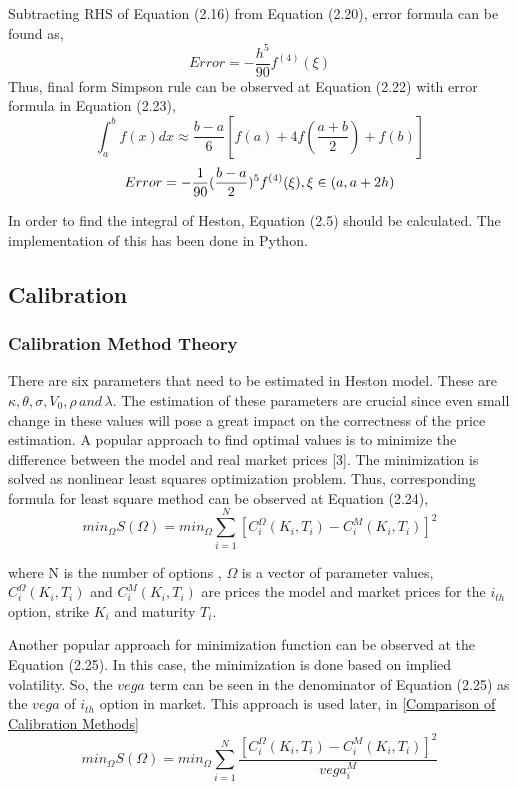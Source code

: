 \documentclass[fontsize=12pt]{article}
\numberwithin{equation}{section} %
\numberwithin{figure}{section} %
\numberwithin{table}{section} %
\begin{document}
Subtracting RHS of Equation (2.16) from Equation (2.20), error formula can be found as,
\begin{equation}
Error = -\dfrac{h^5}{90} f^{(4)} (\xi)
\end{equation}
Thus, final form Simpson rule can be observed at Equation (2.22) with error formula in Equation (2.23),
\begin{equation}
\int_{a}^{b} f(x)dx \approx \dfrac{b-a}{6} [f(a)+4f (\dfrac{a+b}{2})+f(b)] 
\end{equation}
\begin{equation}
Error= -\dfrac{1}{90} (\dfrac{b-a}{2})^5 f^{(4)} (\xi), \\ \xi \in (a,a+2h)
\end{equation}

In order to find the integral of Heston, Equation (2.5) should be calculated. The implementation of this has been done in Python. 


\subsection{Calibration} \label{Calibration1}

\subsubsection{Calibration Method Theory} \label{Calibration Theory}

There are six parameters that need to be estimated in Heston model. These are $ \kappa , \theta, \sigma, V_0, \rho \, and  \, \lambda.$  The estimation of these parameters are crucial since even small change in these values will pose a great impact on the correctness of the price estimation. A popular approach to find optimal values is to minimize the difference between the model and real market prices [3]. The minimization is solved as nonlinear least squares optimization problem. Thus, corresponding formula for least square method can be observed at Equation (2.24),
\begin{equation}
min_\Omega S(\Omega)=min_\Omega \sum^N_{i=1} [C^{\Omega}_i(K_i,T_i)	-C^{M}_i(K_i,T_i)]^2
\end{equation}

where  N is the number of options , $\Omega$ is a vector of parameter values, $C^{\Omega}_i(K_i,T_i)$  and $ C^{M}_i(K_i,T_i)$ are prices the model and market prices for  the $i_{th}$ option,  strike $K_i$ and maturity $T_i$. 

	Another popular approach for minimization function can be observed at the Equation (2.25). In this case, the minimization is done based on implied volatility. So, the $vega$ term can be seen in the denominator of Equation (2.25) as the $vega$ of $i_{th}$ option in market. This approach is used later, in \ref{Comparison of Calibration Methods} 
\begin{equation}
min_\Omega S(\Omega)=min_\Omega \sum^N_{i=1} \dfrac{ [C^{\Omega}_i(K_i,T_i)	-C^{M}_i(K_i,T_i)]^2}{vega_i^M}
\end{equation}
\end{document}
